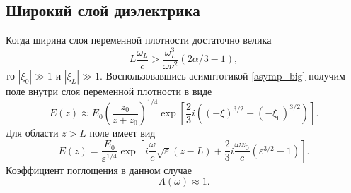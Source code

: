 \documentclass[12pt,a4paper]{article}
\numberwithin{equation}{section}
\begin{document}
\subsection{Широкий слой диэлектрика}
Когда ширина слоя переменной плотности достаточно велика
\begin{equation}
    \label{diel_thick}
    L\frac{\omega_L}{c}>\frac{\omega_L^3}{\omega\nu^2}\left(2\alpha/3-1\right),
\end{equation}
то $|\xi_0|\gg 1$ и $|\xi_L|\gg 1$. Воспользовавшись асимптотикой \eqref{asymp_big} получим поле внутри слоя переменной плотности в виде
\begin{equation}
\label{E1_diel_thick}
    E\left(z\right) \approx E_0 \left(\frac{z_0}{z+z_0}\right)^{1/4} \exp\left[\frac{2}{3}i\left((-\xi)^{3/2}-(-\xi_0)^{3/2}\right)\right].
\end{equation}
Для области $z>L$ поле имеет вид
\begin{equation}
\label{E2_diel_thick}
E\left(z\right) = \frac{E_0}{\varepsilon^{1/4}}\exp\left[i\frac{\omega}{c}\sqrt{\varepsilon}\left(z-L\right)+\frac{2}{3}i\frac{\omega z_0}{c}\left(\varepsilon^{3/2}-1\right)\right].
\end{equation}
Коэффициент поглощения в данном случае
\begin{equation}
    A\left(\omega\right) \approx 1.
\end{equation}
\end{document}
